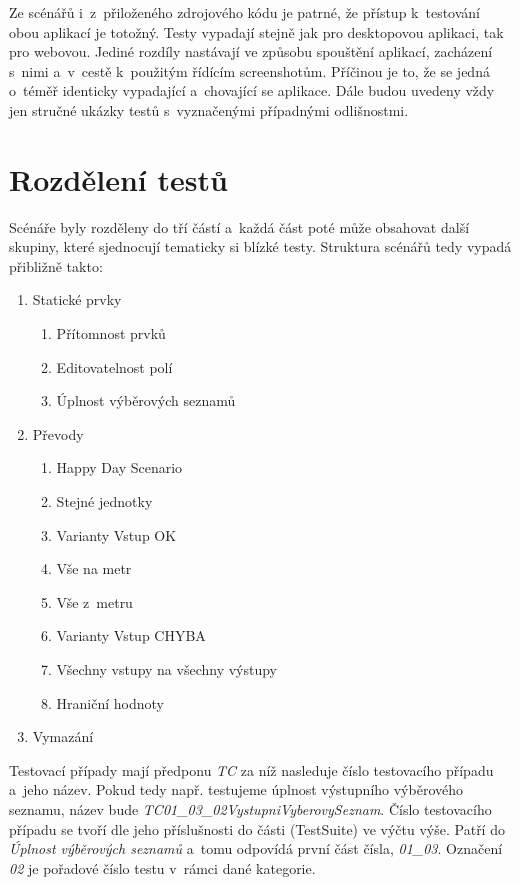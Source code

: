 Ze scénářů i~z~přiloženého zdrojového kódu je patrné, že přístup k~testování obou aplikací je totožný. Testy vypadají stejně jak pro desktopovou aplikaci, tak pro webovou. Jediné rozdíly nastávají ve způsobu spouštění aplikací, zacházení s~nimi a~v~cestě k~použitým řídícím screenshotům. Příčinou je to, že se jedná o~téměř identicky vypadající a~chovající se aplikace. Dále budou uvedeny vždy jen stručné ukázky testů s~vyznačenými případnými odlišnostmi.

	\section{Rozdělení testů}
	Scénáře byly rozděleny do tří částí a~každá část poté může obsahovat další skupiny, které sjednocují tematicky si blízké testy. Struktura scénářů tedy vypadá přibližně takto:
		{\renewcommand{\labelenumii}{\theenumii}
		\renewcommand{\theenumii}{\theenumi.\arabic{enumii}.}
		\begin{enumerate}
		\item Statické prvky
			\begin{enumerate}
			\item Přítomnost prvků
			\item Editovatelnost polí
			\item Úplnost výběrových seznamů
			\end{enumerate}
		\item Převody
			\begin{enumerate}
			\item Happy Day Scenario
			\item Stejné jednotky
			\item Varianty Vstup OK
			\item Vše na metr
			\item Vše z~metru
			\item Varianty Vstup CHYBA
			\item Všechny vstupy na všechny výstupy
			\item Hraniční hodnoty
			\end{enumerate}
		\item Vymazání
		\end{enumerate}}
		
	Testovací případy mají předponu \emph{TC} za níž nasleduje číslo testovacího případu a~jeho název. Pokud tedy např. testujeme úplnost výstupního výběrového seznamu, název bude \emph{TC01\_03\_02VystupniVyberovySeznam}. Číslo testovacího případu se tvoří dle jeho příslušnosti do části (TestSuite) ve výčtu výše. Patří do \emph{Úplnost výběrových seznamů} a~tomu odpovídá první část čísla, \emph{01\_03}. Označení \emph{02} je pořadové číslo testu v~rámci dané kategorie.
		
